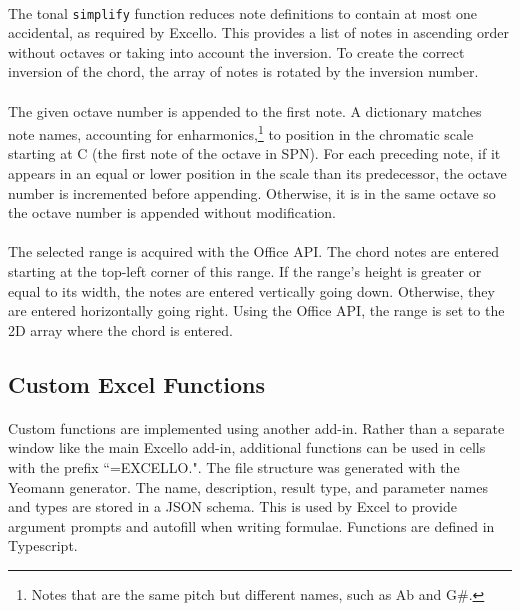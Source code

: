 \paragraph{} The tonal \texttt{simplify} function reduces note definitions to contain at most one accidental, as required by Excello. This provides a list of notes in ascending order without octaves or taking into account the inversion. To create the correct inversion of the chord, the array of notes is rotated by the inversion number.

\paragraph{} The given octave number is appended to the first note. A dictionary matches note names, accounting for enharmonics,\footnote{Notes that are the same pitch but different names, such as Ab and G\#.} to position in the chromatic scale starting at C (the first note of the octave in SPN). For each preceding note, if it appears in an equal or lower position in the scale than its predecessor, the octave number is incremented before appending. Otherwise, it is in the same octave so the octave number is appended without modification.

\paragraph{} The selected range is acquired with the Office API. The chord notes are entered starting at the top-left corner of this range. If the range's height is greater or equal to its width, the notes are entered vertically going down. Otherwise, they are entered horizontally going right. Using the Office API, the range is set to the 2D array where the chord is entered.

\subsection{Custom Excel Functions}

\paragraph{} Custom functions are implemented using another add-in. Rather than a separate window like the main Excello add-in, additional functions can be used in cells with the prefix ``=EXCELLO.". The file structure was generated with the Yeomann generator. The name, description, result type, and parameter names and types are stored in a JSON schema. This is used by Excel to provide argument prompts and autofill when writing formulae. Functions are defined in Typescript.

